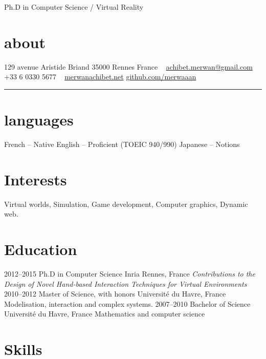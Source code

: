 \documentclass[]{friggeri-cv}
\begin{document}
       {Ph.D in Computer Science / Virtual Reality}

\begin{aside}
  \section{about}\vspace{.25cm}
    129 avenue Aristide Briand
    35000 Rennes
    France
    ~
    \href{mailto:achibet.merwan@gmail.com}{achibet.merwan@gmail.com}
    +33 6 0330 5677
		~
    \href{http://merwanachibet.net}{merwanachibet.net}
    \href{http://github.com/merwaaan}{github.com/merwaaan}
    {\color{lightergray}\rule{3cm}{0.01cm}}
	\section{languages}\vspace{.25cm}
		French {\footnotesize -- Native}\vspace{.4cm}
		English {\footnotesize -- Proficient}
		{\footnotesize (TOEIC 940/990)}\vspace{.4cm}
		Japanese {\footnotesize -- Notions}
\end{aside}

\section{Interests}

Virtual worlds, Simulation, Game development, Computer graphics, Dynamic web.

\section{Education}

\begin{entrylist}
  \entry
    {2012–2015}
    {Ph.D in Computer Science}
    {Inria Rennes, France}
    {\it Contributions to the Design of Novel Hand-based Interaction Techniques for Virtual Environments}
  \entry
    {2010–2012}
    {Master of Science, with honors}
    {Université du Havre, France}
    {Modelisation, interaction and complex systems.}
  \entry
    {2007–2010}
    {Bachelor of Science}
    {Université du Havre, France}
		{Mathematics and computer science}
\end{entrylist}

\section{Skills}
\end{document}
